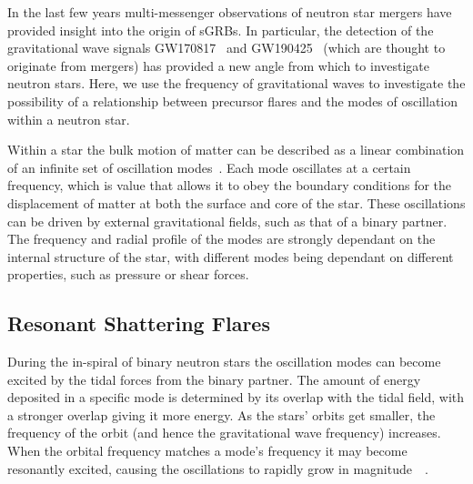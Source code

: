 \documentclass[fleqn,usenatbib]{mnras}
\begin{document}
\hspace{\parindent}In the last few years multi-messenger observations of neutron star mergers have provided insight into the origin of sGRBs. In particular, the detection of the gravitational wave signals GW170817~\cite{abbott2017merger} and GW190425~\cite{abbott2020gw190425} (which are thought to originate from mergers) has provided a new angle from which to investigate neutron stars. Here, we use the frequency of gravitational waves to investigate the possibility of a relationship between precursor flares and the modes of oscillation within a neutron star.%

\hspace{\parindent}Within a star the bulk motion of matter can be described as a linear combination of an infinite set of oscillation modes~\cite{smeyers2011linear}. Each mode oscillates at a certain frequency, which is value that allows it to obey the boundary conditions for the displacement of matter at both the surface and core of the star. These oscillations can be driven by external gravitational fields, such as that of a binary partner. The frequency and radial profile of the modes are strongly dependant on the internal structure of the star, with different modes being dependant on different properties, such as pressure or shear forces.%







\subsection{Resonant Shattering Flares}
\hspace{\parindent}During the in-spiral of binary neutron stars the oscillation modes can become excited by the tidal forces from the binary partner. The amount of energy deposited in a specific mode is determined by its overlap with the tidal field, with a stronger overlap giving it more energy. As the stars' orbits get smaller, the frequency of the orbit (and hence the gravitational wave frequency) increases. When the orbital frequency matches a mode's frequency it may become resonantly excited, causing the oscillations to rapidly grow in magnitude~\cite{tsang2012resonant}~\cite{tsang2013shattering}.
\end{document}
